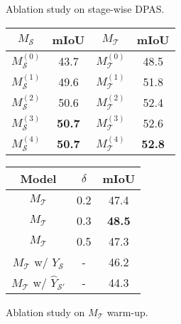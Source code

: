 \documentclass[10pt,twocolumn,letterpaper]{article}
\begin{document}
\begin{figure}[t!]
  \begin{minipage}[c]{0.45\linewidth}
    \small
    \centering
    \makeatletter{}\makeatother\caption{Ablation study on stage-wise DPAS.}
    \label{tab:Ablation_performance}
    \setlength{\tabcolsep}{4pt}
      \begin{tabular}{cccc}
        \toprule[1.0pt]
        $M_{\mathcal{S}}$ &mIoU& $M_{\mathcal{T}}$ &mIoU\\
        \hline
        ${M_{\mathcal{S}}^{(0)}}$ & 43.7 & ${M_{\mathcal{T}}^{(0)}}$ &48.5\\
               
        ${M_{\mathcal{S}}^{(1)}}$ & 49.6 & ${M_{\mathcal{T}}^{(1)}}$ &51.8\\
        
        ${M_{\mathcal{S}}^{(2)}}$ & 50.6 & ${M_{\mathcal{T}}^{(2)}}$&52.4\\
        
         ${M_{\mathcal{S}}^{(3)}}$ & \textbf{50.7} & ${M_{\mathcal{T}}^{(3)}}$ &52.6\\
        ${M_{\mathcal{S}}^{(4)}}$ & \textbf{50.7} & ${M_{\mathcal{T}}^{(4)}}$ &\textbf{52.8}\\
        \bottomrule
        \end{tabular}
   \end{minipage}
   \hspace{.15in}
 \begin{minipage}[c]{0.45\linewidth}
\small
\centering
     \makeatletter{}\makeatother\caption{Ablation study on $M_{\mathcal{T}}$ warm-up.}
         \setlength{\tabcolsep}{4pt}
        \label{tab:Ablation_init}
        \begin{tabular}{ccc}
        
        \toprule[1.0pt]
        Model & $\delta$ &mIoU\\
        \hline
        $M_{\mathcal{T}}$ &0.2 &47.4\\
        $M_{\mathcal{T}}$ &0.3 &\textbf{48.5}\\
       $M_{\mathcal{T}}$ &0.5 & 47.3\\
        \hline
        $M_{\mathcal{T}}$ w/ $Y_{\mathcal{S}}$& - &46.2\\
        $M_{\mathcal{T}}$ w/ $\hat{Y}_{\mathcal{S}'}$ & - &44.3\\
        \bottomrule
        
        \end{tabular}
  \end{minipage}
\vspace{-0.7cm}
\end{figure}
\end{document}
